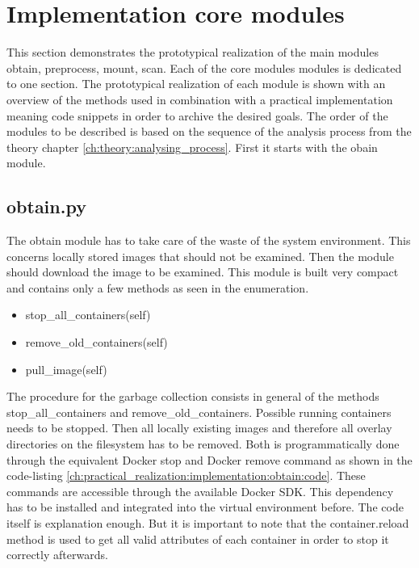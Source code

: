 \section{Implementation core modules}
\label{ch:practical_realization:implementation}
This section demonstrates the prototypical realization of the main modules obtain, preprocess, mount, scan.
Each of the core modules modules is dedicated to one section.
The prototypical realization of each module is shown with an overview of the methods used in combination with a practical implementation meaning code snippets in order to archive the desired goals. 
The order of the modules to be described is based on the sequence of the analysis process from the theory chapter \ref{ch:theory:analysing_process}.
First it starts with the obain module.

\subsection{obtain.py}
\label{ch:practical_realization:implementation:obtain}
The obtain module has to take care of the waste of the system environment. This concerns locally stored images that should not be examined. 
Then the module should download the image to be examined. This module is built very compact and contains only a few methods as seen in the enumeration.
\begin{itemize}
\item stop\_all\_containers(self)
\item remove\_old\_containers(self)
\item pull\_image(self)
\end{itemize}
The procedure for the garbage collection consists in general of the methods stop\_all\_containers and remove\_old\_containers. Possible running containers needs to be stopped.
Then all locally existing images and therefore all overlay directories on the filesystem has to be removed. Both is programmatically done through the equivalent Docker stop and Docker remove command as shown in the code-listing \ref{ch:practical_realization:implementation:obtain:code}. These commands are accessible through the available Docker SDK. This dependency has to be installed and integrated into the virtual environment before. 
The code itself is explanation enough. But it is important to note that the container.reload method is used to get all valid attributes of each container in order to stop it correctly afterwards.

